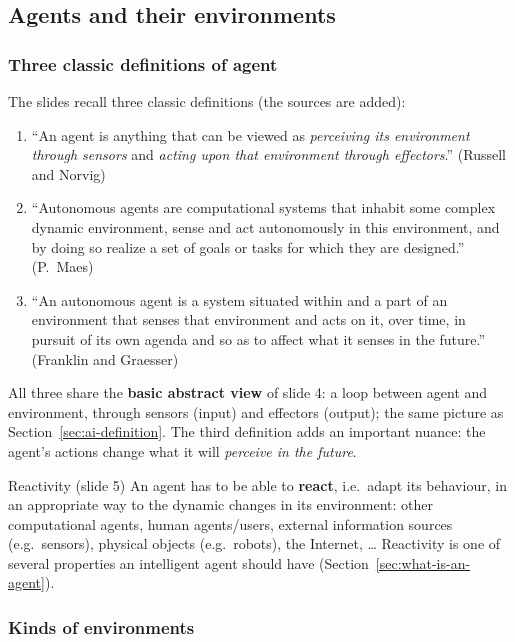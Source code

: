 \subsection{Agents and their environments}
\label{sec:agents-and-environments}

\subsubsection{Three classic definitions of agent}

The slides recall three classic definitions (the sources are added):
\begin{enumerate}
  \item ``An agent is anything that can be viewed as \emph{perceiving its environment
        through sensors} and \emph{acting upon that environment through effectors}.''
        \hfill (Russell and Norvig)
  \item ``Autonomous agents are computational systems that inhabit some complex dynamic
        environment, sense and act autonomously in this environment, and by doing so realize
        a set of goals or tasks for which they are designed.'' \hfill (P.~Maes)
  \item ``An autonomous agent is a system situated within and a part of an environment that
        senses that environment and acts on it, over time, in pursuit of its own agenda and
        so as to affect what it senses in the future.'' \hfill (Franklin and Graesser)
\end{enumerate}
All three share the \textbf{basic abstract view} of slide 4: a loop between agent and
environment, through sensors (input) and effectors (output); the same picture as
Section~\ref{sec:ai-definition}. The third definition adds an important nuance:
the agent's actions change what it will \emph{perceive in the future}.

\begin{nbdef}{Reactivity (slide 5)}
An agent has to be able to \textbf{react}, i.e.\ adapt its behaviour, in an appropriate way
to the dynamic changes in its environment: other computational agents, human
agents/users, external information sources (e.g.\ sensors), physical objects (e.g.\
robots), the Internet, \ldots{} Reactivity is one of several properties an intelligent agent
should have (Section~\ref{sec:what-is-an-agent}).
\end{nbdef}

\subsubsection{Kinds of environments}

